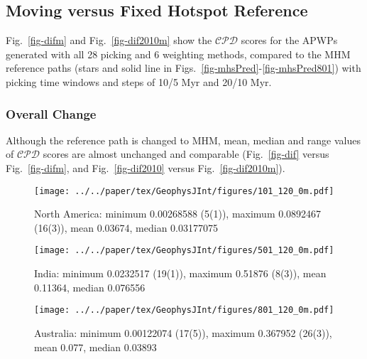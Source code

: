 \subsection{Moving versus Fixed Hotspot Reference}

Fig.~\ref{fig-difm} and Fig.~\ref{fig-dif2010m} show the $\mathcal{CPD}$ scores
for the APWPs generated with all 28 picking and 6 weighting methods, compared to
the MHM reference paths (stars and solid line in Figs.~\ref{fig-mhsPred}-\ref{fig-mhsPred801})
with picking time windows and steps of 10/5 Myr and 20/10 Myr.

\subsubsection{Overall Change}

Although the reference path is changed to MHM, mean, median and range values of
$\mathcal{CPD}$ scores are almost unchanged and comparable (Fig.~\ref{fig-dif}
versus Fig.~\ref{fig-difm}, and Fig.~\ref{fig-dif2010} versus
Fig.~\ref{fig-dif2010m}).

\begin{figure*}
	\centering
	\begin{subfigure}{1.01\textwidth}
		\texttt{[image: ../../paper/tex/GeophysJInt/figures/101\_120\_0m.pdf]}
		\caption{North America: minimum 0.00268588 (5(1)),
		maximum 0.0892467 (16(3)), mean 0.03674, median 0.03177075}\label{fig-na-difm}
	\end{subfigure}
	\vspace{.1em}
	\begin{subfigure}{1.01\textwidth}
		\texttt{[image: ../../paper/tex/GeophysJInt/figures/501\_120\_0m.pdf]}
		\caption{India: minimum 0.0232517 (19(1)), maximum 0.51876 (8(3)),
		mean 0.11364, median 0.076556}\label{fig-in-difm}
	\end{subfigure}
	\vspace{.1em}
	\begin{subfigure}{1.01\textwidth}
		\texttt{[image: ../../paper/tex/GeophysJInt/figures/801\_120\_0m.pdf]}
		\caption{Australia: minimum 0.00122074 (17(5)), maximum
		0.367952 (26(3)), mean 0.077, median 0.03893}\label{fig-au-difm}
	\end{subfigure}
	\caption[$\mathcal{CPD}$ of each plate's paleomagnetic APWPs vs
its MHM predicted APWP]{As Fig.~\ref{fig-dif}, here the reference path is
predicted from MHM\@. See the numbers of the picked paleopoles for methods in
Fig.~\ref{fig-dif}.}\label{fig-difm}
\end{figure*}

